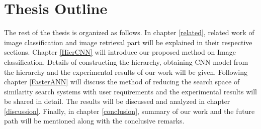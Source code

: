 \section{Thesis Outline}

The rest of the thesis is organized as follows. 
In chapter \ref{related}, related work of image classification and image retrieval part will be explained in their respective sections. Chapter \ref{HierCNN} will introduce our proposed method on Image classification. 
Details of constructing the hierarchy, obtaining CNN model from the hierarchy and the experimental results of our work will be given. 
Following chapter \ref{FasterANN} will discuss the method of reducing the search space of similarity search systems with user requirements and the experimental results will be shared in detail.
The results will be discussed and analyzed in chapter \ref{discussion}. Finally, in chapter \ref{conclusion}, summary of our work and the future path will be mentioned along with the conclusive remarks.


